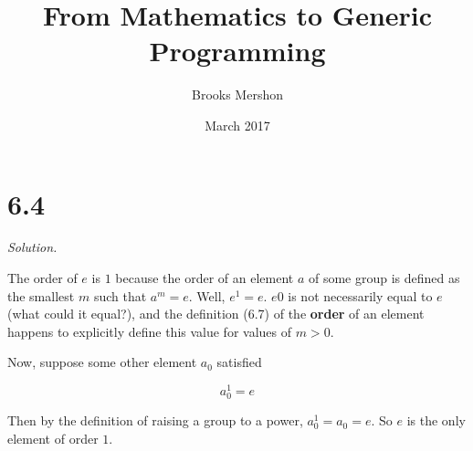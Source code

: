 \documentclass{article}
\title{From Mathematics to Generic Programming}
\author{Brooks Mershon}
\date{March 2017}
\begin{document}
\maketitle

\section*{6.4}

\textit{Solution.}

The order of $e$ is $1$ because the order of an element $a$ of some group is defined as the smallest $m$ such that $a^m = e$. Well, $e^1 = e$. $e0$ is not necessarily equal to $e$ (what could it equal?), and the definition (6.7) of the \textbf{order} of an element happens to explicitly define this value for values of $m > 0$.

Now, suppose some other element $a_0$ satisfied

$$a_{0}^{1} = e$$

Then by the definition of raising a group to a power, $a_{0}^{1} = a_0 = e$. So $e$ is the only element of order $1$.
\end{document}
